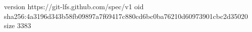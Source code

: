 version https://git-lfs.github.com/spec/v1
oid sha256:4a3196d343b58fb09897a7f69417c880cd6bc0ba76210d60973901cbc2d35020
size 3383
